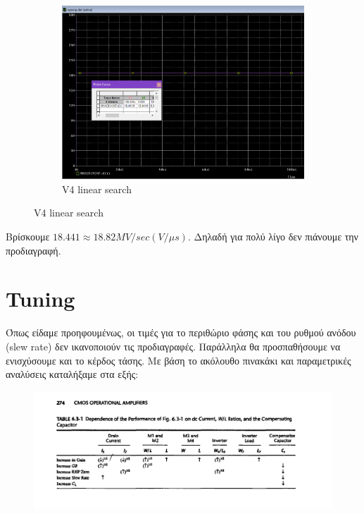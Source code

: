 \documentclass[12pt, a4paper]{article}
\begin{document}
\begin{figure}[h!]
\begin{subfigure}[b]{0.5\textwidth}
         \includegraphics[height=.4\textheight, width=\textwidth, keepaspectratio]{assets/slew_rate.png}
         \caption{V4 linear search} 
     \end{subfigure}
\end{figure}

Βρίσκουμε $18.441  \approx 18.82 MV/sec (V/μs)$. Δηλαδή για πολύ λίγο δεν πιάνουμε την προδιαγραφή.

\section{Tuning}

Όπως είδαμε προηφουμένως, οι τιμές για το περιθώριο φάσης και του ρυθμού ανόδου (slew rate) δεν ικανοποιούν τις προδιαγραφές. Παράλληλα θα προσπαθήσουμε να ενισχύσουμε και το κέρδος τάσης. Με βάση το ακόλουθο πινακάκι και παραμετρικές αναλύσεις καταλήξαμε στα εξής:

\begin{figure}[h!]
	\centering
	\includegraphics[width = \textwidth, height = .2\textheight, keepaspectratio]{assets/tuning_table.png}
\end{figure}
\end{document}
